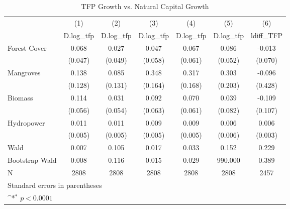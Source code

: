 \begin{table}[htbp]\centering
\def\sym#1{\ifmmode^{#1}\else\(^{#1}\)\fi}
\caption{TFP Growth vs. Natural Capital Growth}
\begin{tabular}{l*{6}{c}}
\hline\hline
            &\multicolumn{1}{c}{(1)}&\multicolumn{1}{c}{(2)}&\multicolumn{1}{c}{(3)}&\multicolumn{1}{c}{(4)}&\multicolumn{1}{c}{(5)}&\multicolumn{1}{c}{(6)}\\
            &\multicolumn{1}{c}{D.log\_tfp}&\multicolumn{1}{c}{D.log\_tfp}&\multicolumn{1}{c}{D.log\_tfp}&\multicolumn{1}{c}{D.log\_tfp}&\multicolumn{1}{c}{D.log\_tfp}&\multicolumn{1}{c}{ldiff\_TFP}\\
\hline
Forest Cover &       0.068       &       0.027       &       0.047       &       0.067       &       0.086       &      -0.013       \\
            &     (0.047)       &     (0.049)       &     (0.058)       &     (0.061)       &     (0.052)       &     (0.070)       \\
[1em]
Mangroves &       0.138       &       0.085       &       0.348       &       0.317       &       0.303       &      -0.096       \\
            &     (0.128)       &     (0.131)       &     (0.164)       &     (0.168)       &     (0.203)       &     (0.428)       \\
[1em]
Biomass &       0.114       &       0.031       &       0.092       &       0.070       &       0.039       &      -0.109       \\
            &     (0.056)       &     (0.054)       &     (0.063)       &     (0.061)       &     (0.082)       &     (0.107)       \\
[1em]
Hydropower &       0.011       &       0.011       &       0.009       &       0.009       &       0.006       &       0.006       \\
            &     (0.005)       &     (0.005)       &     (0.005)       &     (0.005)       &     (0.006)       &     (0.003)       \\
\hline
Wald        &       0.007       &       0.105       &       0.017       &       0.033       &       0.152       &       0.229       \\
Bootstrap Wald&       0.008       &       0.116       &       0.015       &       0.029       &     990.000       &       0.389       \\
N           &        2808       &        2808       &        2808       &        2808       &        2808       &        2457       \\
\hline\hline
\multicolumn{7}{l}{\footnotesize Standard errors in parentheses}\\
\multicolumn{7}{l}{\footnotesize \sym{*} \(p<0.0001\)}\\
\end{tabular}
\end{table}
